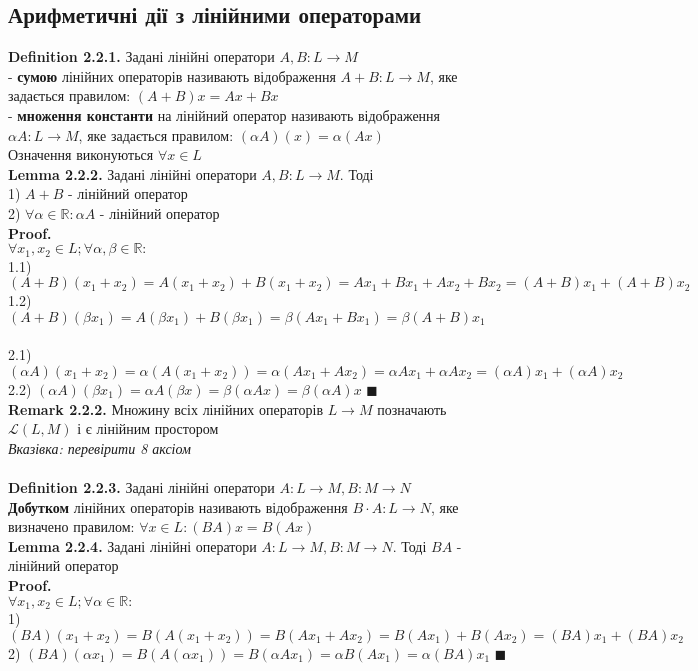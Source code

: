 \documentclass[a4paper, 14pt]{extarticle}
\def\defin#1{\textbf{Definition {#1}}}
\def\rm#1{\textbf{Remark {#1}}}
\def\lm#1{\textbf{Lemma {#1}}}
\def\proof{\textbf{Proof.}\\}
\def\bigline{\vspace{5mm}\\}
\def\qed{$\blacksquare$}
\begin{document}
	\subsection{Арифметичні дії з лінійними операторами}
	\defin{2.2.1.} Задані лінійні оператори $A,B: L \to M$\\
	- \textbf{сумою} лінійних операторів називають відображення $A+B: L \to M$, яке задається правилом: $(A+B)x = Ax+Bx$\\
	- \textbf{множення константи} на лінійний оператор називають відображення $\alpha A: L \to M$, яке задається правилом: $(\alpha A)(x) = \alpha (Ax)$\\
	Означення виконуються $\forall x \in L$
	\bigline
	\lm{2.2.2.} Задані лінійні оператори $A,B: L \to M$. Тоді\\
	1) $A+B$ - лінійний оператор\\
	2) $\forall \alpha \in \mathbb{R}: \alpha A$ - лінійний оператор\\
	\proof
	$\forall x_1, x_2 \in L; \forall \alpha, \beta \in \mathbb{R}:$\\
	1.1) $(A+B)(x_1+x_2) = A(x_1+x_2)+B(x_1+x_2)=Ax_1+Bx_1+Ax_2+Bx_2=(A+B)x_1 + (A+B)x_2$\\
	1.2) $(A+B)(\beta x_1) = A(\beta x_1)+B(\beta x_1)=\beta (Ax_1+Bx_1) = \beta(A+B)x_1$\\
	\\
	2.1) $(\alpha A)(x_1+x_2) = \alpha(A(x_1+x_2))=\alpha(Ax_1 + Ax_2) = \alpha Ax_1 + \alpha Ax_2 = (\alpha A)x_1 + (\alpha A)x_2$\\
	2.2) $(\alpha A) (\beta x_1) = \alpha A(\beta x) = \beta(\alpha Ax) = \beta (\alpha A)x$ \qed
	\bigline
	\rm{2.2.2.} Множину всіх лінійних операторів $L \to M$ позначають $\mathcal{L}(L,M)$ і є лінійним простором\\
	\textit{Вказівка: перевірити 8 аксіом}
	\\
	\\
	\defin{2.2.3.} Задані лінійні оператори $A: L \to M, B: M \to N$\\
	\textbf{Добутком} лінійних операторів називають відображення $B\cdot A: L \to N$, яке визначено правилом: $\forall x \in L: (BA)x = B(Ax)$
	\bigline
	\lm{2.2.4.} Задані лінійні оператори $A: L \to M, B: M \to N$. Тоді $BA$ - лінійний оператор\\
	\proof
	$\forall x_1, x_2 \in L; \forall \alpha \in \mathbb{R}:$\\
	1) $(BA)(x_1+x_2) = B(A(x_1+x_2)) = B(Ax_1+Ax_2)=B(Ax_1) + B(Ax_2)=(BA)x_1+(BA)x_2$\\
	2) $(BA)(\alpha x_1) = B(A(\alpha x_1)) = B(\alpha Ax_1) = \alpha B(Ax_1) = \alpha (BA)x_1$ \qed
\end{document}
